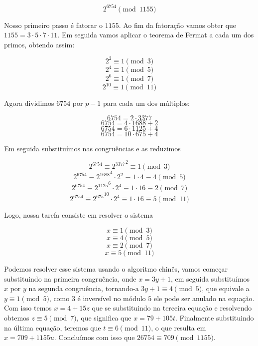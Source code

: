 $$ 2^{6754} \pmod{1155}$$

Nosso primeiro passo \'e fatorar o $1155$. Ao fim da fatora\c{c}\~ao vamos obter que $1155 = 3 \cdot 5 \cdot 7 \cdot 11$. Em seguida vamos aplicar o teorema de Fermat a cada um dos primos, obtendo assim:

$$ 2^2 \equiv 1 \pmod{3}$$
$$ 2^4 \equiv 1 \pmod{5}$$ 
$$ 2^6 \equiv 1 \pmod{7}$$  
$$ 2^{10} \equiv 1 \pmod{11}$$

Agora dividimos $6754$ por $p-1$ para cada um dos m\'ultiplos:

$$6754 = 2 \cdot 3377 $$
$$6754 = 4 \cdot 1688 + 2$$
$$6754 = 6 \cdot 1125 + 4$$
$$6754 = 10 \cdot 675 + 4$$ 

Em seguida substitu\'imos nas congru\^encias e as reduzimos

$$2^{6754} \equiv {2^{3377}}^{2} \equiv 1 \pmod{3} $$  
$$2^{6754} \equiv {2^{1688}}^{4} \cdot 2^2 \equiv 1 \cdot 4 \equiv  4 \pmod{5}$$  
$$2^{6754} \equiv {2^{1125}}^{6} \cdot 2^4 \equiv 1 \cdot 16\equiv  2 \pmod{7}$$ 
$$2^{6754} \equiv {2^{675}}^{10} \cdot 2^4 \equiv 1 \cdot 16\equiv  5 \pmod{11}$$  

Logo, nossa tarefa consiste em resolver o sistema

$$x \equiv 1 \pmod{3}$$
$$x \equiv 4 \pmod{5}$$
$$x \equiv 2 \pmod{7}$$
$$x \equiv 5 \pmod{11}$$  

Podemos resolver esse sistema usando o algoritmo chin\^es, vamos come\c{c}ar substituindo na primeira congru\^encia, onde $x = 3y + 1$, em seguida substitu\'imos $x$ por $y$ na segunda congru\^encia, tornando-a $3y + 1 \equiv 4 \pmod{5}$, que equivale a $y \equiv 1 \pmod{5}$, como $3$ \'e invers\'ivel no m\'odulo $5$ ele pode ser anulado na equa\c{c}\~ao. Com isso temos $x = 4+15z$ que se substituindo na terceira equa\c{c}\~ao e resolvendo obtemos $z \equiv 5 \pmod{7}$, que significa que $x = 79 + 105t$. Finalmente substituindo na \'ultima equa\c{c}\~ao, teremos que $t \equiv 6 \pmod{11}$, o que resulta em $x = 709+1155u$. Conclu\'imos com isso que $26754 \equiv 709 \pmod{1155}$. 